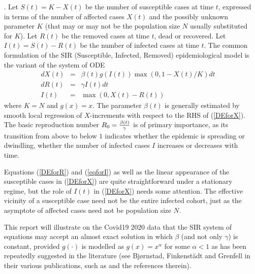 \documentclass{article}
\begin{document}
. Let $S(t) = K - X(t)$ be the number of susceptible cases at time $t$, expressed in terms of the number of affected cases $X(t)$ and the possibly unknown parameter $K$ (that may or may not be the population size $N$ usually substituted for $K$). Let $R(t)$ be the removed cases at time $t$, dead
or recovered.
Let $I(t)=S(t)-R(t)$ be the number of infected cases at time $t$. The common formulation of the SIR (Susceptible, Infected, Removed) epidemiological model is the variant of the system of ODE
\begin{eqnarray}
dX(t) & = & \beta(t) g(I(t)) \max(0,1 - X(t)/K) dt \label{DEforX} \\
dR(t) & = & \gamma I(t) dt \label{DEforR} \\
I(t) & = & \max(0,X(t)-R(t)) \label{eqforI}
\end{eqnarray}
where $K=N$ and $g(x)=x$. The parameter $\beta(t)$ is generally estimated by smooth local regression of \linebreak $X$-increments with respect to the RHS of (\ref{DEforX}). The basic reproduction number $R_0={{\beta(t)} \over \gamma}$ is of primary importance, as its transition from above to below $1$ indicates whether the epidemic is spreading or dwindling, whether the number of infected cases $I$ increases or decreases with time.

\bigskip

Equations (\ref{DEforR}) and (\ref{eqforI}) as well as the linear appearance of the susceptible cases in (\ref{DEforX}) are quite straightforward under a stationary regime, but the role of $I(t)$ in (\ref{DEforX}) needs some attention. The effective vicinity of a susceptible case need not be the entire infected cohort, just as the asymptote of affected cases need not be population size $N$.

This report will illustrate on the Covid19 2020 data that
the SIR system of equations may accept an almost exact solution in which $\beta$ (and not only $\gamma$) is constant, provided $g(\cdot)$ is modelled as $g(x)=x^\alpha$
for some $\alpha<1$ as has been repeatedly suggested in the literature (see Bj{\o}rnstad, Finkenst\"{a}dt and Grenfell in their various publications, such as \cite{AAA} and the references therein).
\end{document}
